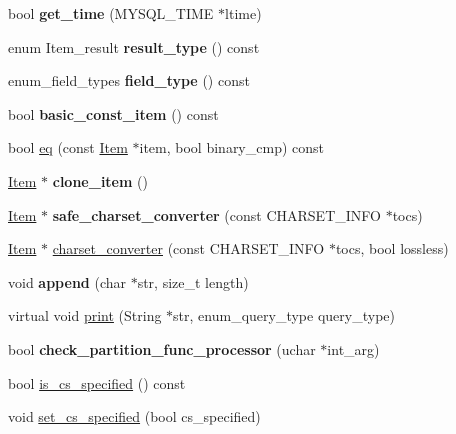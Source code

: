 \begin{DoxyCompactItemize}
\mbox{\label{classItem__string_a6aacbd56b46740856c348f725645027c}} 
bool {\bfseries get\+\_\+time} (M\+Y\+S\+Q\+L\+\_\+\+T\+I\+ME $\ast$ltime)
\item 
\mbox{\label{classItem__string_a778fecba71e6736474948a7a75d4195b}} 
enum Item\+\_\+result {\bfseries result\+\_\+type} () const
\item 
\mbox{\label{classItem__string_a5fa1eb8ac7531160ab1ab5c08d690b97}} 
enum\+\_\+field\+\_\+types {\bfseries field\+\_\+type} () const
\item 
\mbox{\label{classItem__string_afb44073ffd9ba7e9b13b23db2ce158d9}} 
bool {\bfseries basic\+\_\+const\+\_\+item} () const
\item 
bool \mbox{\hyperlink{classItem__string_abe8d23ca4b542969781ed21793fe96e5}{eq}} (const \mbox{\hyperlink{classItem}{Item}} $\ast$item, bool binary\+\_\+cmp) const
\item 
\mbox{\label{classItem__string_acaa44527c9cdfe347cd7428e71174544}} 
\mbox{\hyperlink{classItem}{Item}} $\ast$ {\bfseries clone\+\_\+item} ()
\item 
\mbox{\label{classItem__string_ae2116e1f5af63738365be4604c6e4726}} 
\mbox{\hyperlink{classItem}{Item}} $\ast$ {\bfseries safe\+\_\+charset\+\_\+converter} (const C\+H\+A\+R\+S\+E\+T\+\_\+\+I\+N\+FO $\ast$tocs)
\item 
\mbox{\hyperlink{classItem}{Item}} $\ast$ \mbox{\hyperlink{classItem__string_aa4c57929e17aaf021d8d31bf4d61a994}{charset\+\_\+converter}} (const C\+H\+A\+R\+S\+E\+T\+\_\+\+I\+N\+FO $\ast$tocs, bool lossless)
\item 
\mbox{\label{classItem__string_a2a4df5e7fd06b871d0d733a408a3746b}} 
void {\bfseries append} (char $\ast$str, size\+\_\+t length)
\item 
virtual void \mbox{\hyperlink{classItem__string_a4d6fccdca40394df6239ca7dfbb9bb09}{print}} (String $\ast$str, enum\+\_\+query\+\_\+type query\+\_\+type)
\item 
\mbox{\label{classItem__string_aabc71b5a7e0321727327d285ea8ab4c8}} 
bool {\bfseries check\+\_\+partition\+\_\+func\+\_\+processor} (uchar $\ast$int\+\_\+arg)
\item 
bool \mbox{\hyperlink{classItem__string_a1f29a4504141f987ed2df80187fd4749}{is\+\_\+cs\+\_\+specified}} () const
\item 
void \mbox{\hyperlink{classItem__string_a13e88d867e7492fd75a5fae20ec244e5}{set\+\_\+cs\+\_\+specified}} (bool cs\+\_\+specified)
\end{DoxyCompactItemize}
